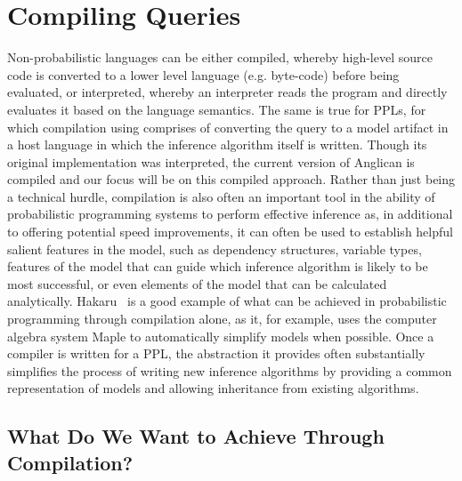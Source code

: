 
\section{Compiling Queries}
\label{sec:proginf:comp}

Non-probabilistic languages can be either compiled, whereby high-level source code
is converted to a lower level language (e.g. byte-code) before being evaluated, or interpreted,
whereby an interpreter reads the program and directly evaluates it based on the language
semantics.
The same is true for PPLs, for which compilation using comprises of converting the
query to a model artifact in a host language in which the inference algorithm itself is
written.  Though its original implementation was interpreted, the current version of
Anglican is compiled and our focus will be on this compiled approach.
Rather than just being a technical hurdle, compilation is also 
often an important tool in the ability of probabilistic programming systems to perform
effective inference as, in additional to offering potential speed improvements,
it can often be used to establish helpful salient features in the model,
such as dependency structures, variable types, features of the model that can guide
which inference algorithm is likely to be most successful, or even elements of the model
that can be calculated analytically.  Hakaru~\citep{narayanan2016probabilistic,zinkov2016composing} is a good
example of what can be achieved in probabilistic programming through compilation alone,
as it, for example, uses the computer algebra system Maple to automatically simplify models
when possible.  Once a compiler is written for a PPL, the abstraction it provides often substantially simplifies
the process of writing new inference algorithms by providing a common representation of
models and allowing inheritance from existing algorithms.

\subsection{What Do We Want to Achieve Through Compilation?}
\label{sec:proginf:comp:want}


